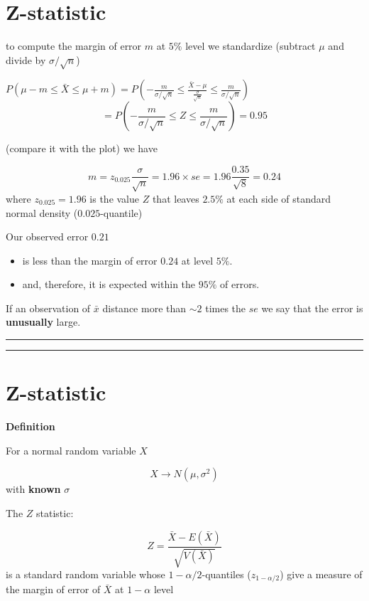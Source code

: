 \documentclass[
]{book}
\begin{document}
\hypertarget{z-statistic-1}{%
\section{Z-statistic}\label{z-statistic-1}}

to compute the margin of error \(m\) at \(5\%\) level we standardize (subtract \(\mu\) and divide by \(\sigma/\sqrt{n}\))

\(P(\mu-m \leq \bar{X} \leq\mu + m)=P(-\frac{m}{\sigma/\sqrt{n}} \leq \frac{\bar{X}-\mu}{\frac{\sigma}{\sqrt{n}}}\leq\frac{m}{\sigma/\sqrt{n}})\)
\[=P(-\frac{m}{\sigma/\sqrt{n}} \leq Z \leq\frac{m}{\sigma/\sqrt{n}})=0.95\]

(compare it with the plot) we have

\[m=z_{0.025} \frac{\sigma}{\sqrt{n}}=1.96\times se=1.96\frac{0.35}{\sqrt{8}}=0.24\]
where \(z_{0.025}=1.96\) is the value \(Z\) that leaves \(2.5\%\) at each side of standard normal density (\(0.025\)-quantile)

Our observed error \(0.21\)

\begin{itemize}
\item
  is less than the margin of error \(0.24\) at level \(5\%\).
\item
  and, therefore, it is expected within the \(95\%\) of errors.
\end{itemize}

If an observation of \(\bar{x}\) distance more than \(\sim 2\) times the \(se\) we say that the error is \textbf{unusually} large.

\begin{center}\rule{0.5\linewidth}{0.5pt}\end{center}

\begin{center}\rule{0.5\linewidth}{0.5pt}\end{center}

\hypertarget{z-statistic-2}{%
\section{Z-statistic}\label{z-statistic-2}}

\textbf{Definition}

For a normal random variable \(X\)

\[X \rightarrow N(\mu, \sigma^2)\] with \textbf{known} \(\sigma\)

The \(Z\) statistic:

\[Z=\frac{\bar{X}-E(\bar{X})}{\sqrt{V(\bar{X})}}\]
is a standard random variable whose \(1-\alpha/2\)-quantiles (\(z_{1-\alpha/2}\)) give a measure of the margin of error of \(\bar{X}\) at \(1-\alpha\) level
\end{document}
